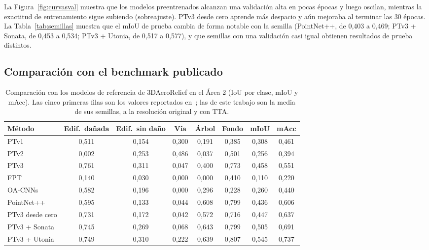 \documentclass[5p]{elsarticle}
\begin{document}
La Figura~\ref{fig:curvasval} muestra que los modelos preentrenados alcanzan una validación alta en pocas épocas y luego oscilan, mientras la exactitud de entrenamiento sigue subiendo (sobreajuste). PTv3 desde cero aprende más despacio y aún mejoraba al terminar las 30 épocas. La Tabla~\ref{tab:semillas} muestra que el mIoU de prueba cambia de forma notable con la semilla (PointNet++, de 0,403 a 0,469; PTv3 + Sonata, de 0,453 a 0,534; PTv3 + Utonia, de 0,517 a 0,577), y que semillas con una validación casi igual obtienen resultados de prueba distintos.

\subsection{Comparación con el benchmark publicado}

\begin{table}[t]
\centering
\caption{Comparación con los modelos de referencia de 3DAeroRelief en el Área 2 (IoU por clase, mIoU y mAcc). Las cinco primeras filas son los valores reportados en~\cite{Le2026}; las de este trabajo son la media de sus semillas, a la resolución original y con TTA.}\label{tab:comparacion}
\footnotesize
\begin{tabular}{@{}lccccccc@{}}
\toprule
Método & Edif.\ dañada & Edif.\ sin daño & Vía & Árbol & Fondo & mIoU & mAcc \\
\midrule
PTv1~\cite{Zhao2021} & 0,511 & 0,154 & 0,300 & 0,191 & 0,385 & 0,308 & 0,461 \\
PTv2~\cite{Wu2022} & 0,002 & 0,253 & 0,486 & 0,037 & 0,501 & 0,256 & 0,394 \\
PTv3~\cite{Wu2024} & 0,761 & 0,311 & 0,047 & 0,400 & 0,773 & 0,458 & 0,551 \\
FPT~\cite{Park2022} & 0,140 & 0,030 & 0,000 & 0,000 & 0,410 & 0,110 & 0,220 \\
OA-CNNs~\cite{Peng2024} & 0,582 & 0,196 & 0,000 & 0,296 & 0,228 & 0,260 & 0,440 \\
\midrule
PointNet++ & 0,595 & 0,133 & 0,044 & 0,608 & 0,799 & 0,436 & 0,606 \\
PTv3 desde cero & 0,731 & 0,172 & 0,042 & 0,572 & 0,716 & 0,447 & 0,637 \\
PTv3 + Sonata & 0,745 & 0,269 & 0,068 & 0,643 & 0,799 & 0,505 & 0,691 \\
PTv3 + Utonia & 0,749 & 0,310 & 0,222 & 0,639 & 0,807 & 0,545 & 0,737 \\
\bottomrule
\end{tabular}
\end{table}
\end{document}

